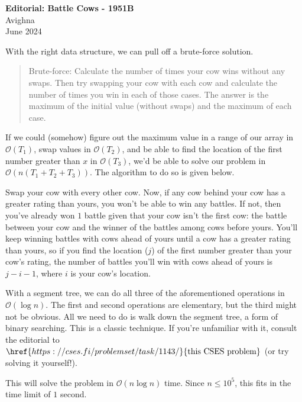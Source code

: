 \documentclass{article}
\begin{document}
\begin{center}
  \large{\textbf{Editorial: Battle Cows - 1951B}}\\
  \vspace{0.2em}
  \large{Avighna}\\
  \vspace{0.2em}
  \large{June 2024}
\end{center}

With the right data structure, we can pull off a brute-force solution.

\begin{quote}
Brute-force: Calculate the number of times your cow wins without any swaps. Then try swapping your cow with each cow and calculate the number of times you win in each of those cases. The answer is the maximum of the initial value (without swaps) and the maximum of each case.
\end{quote}

If we could (somehow) figure out the maximum value in a range of our array in $\mathcal{O}(T_1)$, swap values in $\mathcal{O}(T_2)$, and be able to find the location of the first number greater than $x$ in $\mathcal{O}(T_3)$, we'd be able to solve our problem in $\mathcal{O}(n(T_1+T_2+T_3))$. The algorithm to do so is given below.

Swap your cow with every other cow. Now, if any cow behind your cow has a greater rating than yours, you won't be able to win any battles. If not, then you've already won $1$ battle given that your cow isn't the first cow: the battle between your cow and the winner of the battles among cows before yours. You'll keep winning battles with cows ahead of yours until a cow has a greater rating than yours, so if you find the location ($j$) of the first number greater than your cow's rating, the number of battles you'll win with cows ahead of yours is $j-i-1$, where $i$ is your cow's location.

With a segment tree, we can do all three of the aforementioned operations in $\mathcal{O}(\log{n})$. The first and second operations are elementary, but the third might not be obvious. All we need to do is walk down the segment tree, a form of binary searching. This is a classic technique. If you're unfamiliar with it, consult the editorial to $\href{https://cses.fi/problemset/task/1143/}{\text{this CSES problem}}$ (or try solving it yourself!).

This will solve the problem in $\mathcal{O}(n \log n)$ time. Since $n \le 10^5$, this fits in the time limit of $1$ second.
\end{document}
